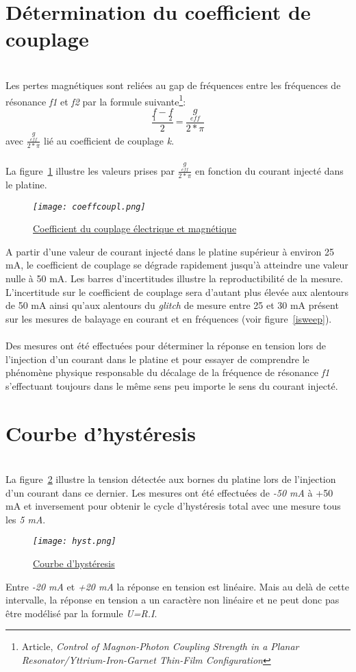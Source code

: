 \documentclass[12pt,fleqn]{book} %
\begin{document}
\section{Détermination du coefficient de couplage}
~\\\noindent Les pertes magnétiques sont reliées au gap de fréquences entre les fréquences de résonance \emph{f1} et \emph{f2} par la formule suivante\footnote{Article, \emph{Control of Magnon-Photon Coupling Strength in a Planar Resonator/Yttrium-Iron-Garnet Thin-Film Configuration}}: 
$$\frac{\underset{1}{f}-\underset{2}{f}}{2}\ \text{=}\ \frac{\underset{eff}{g}}{2*\pi}$$
avec $\frac{\underset{eff}{g}}{2*\pi}$ lié au coefficient de couplage \emph{k}.
~\\\\La figure~\underline{\color{blue}\ref{coeffcoupl}} illustre les valeurs prises par $\frac{\underset{eff}{g}}{2*\pi}$ en fonction du courant injecté dans le platine.
\begin{figure}[H]
	\centering
	\itshape
	\texttt{[image: coeffcoupl.png]}
	\caption{\label{coeffcoupl} \underline{Coefficient du couplage électrique et magnétique}}
\end{figure}
\noindent A partir d'une valeur de courant injecté dans le platine supérieur à environ 25 mA, le coefficient de couplage se dégrade rapidement jusqu'à atteindre une valeur nulle à 50 mA. Les barres d'incertitudes illustre la reproductibilité de la mesure. L'incertitude sur le coefficient de couplage sera d'autant plus élevée aux alentours de 50 mA ainsi qu'aux alentours du \emph{glitch} de mesure entre 25 et 30 mA présent sur les mesures de balayage en courant et en fréquences (voir figure~\underline{\color{blue}\ref{isweep}}).
~\\\\Des mesures ont été effectuées pour déterminer la réponse en tension lors de l'injection d'un courant dans le platine et pour essayer de comprendre le phénomène physique responsable du décalage de la fréquence de résonance \emph{f1} s'effectuant toujours dans le même sens peu importe le sens du courant injecté. 
\section{Courbe d'hystéresis}
~\\\noindent La figure~\underline{\color{blue}\ref{hyst}} illustre la tension détectée aux bornes du platine lors de l'injection d'un courant dans ce dernier. Les mesures ont été effectuées de \emph{-50 mA} à {+50 mA} et inversement pour obtenir le cycle d'hystéresis total avec une mesure tous les \emph{5 mA}.
\begin{figure}[H]
	\centering
	\itshape
	\texttt{[image: hyst.png]}
	\caption{\label{hyst} \underline{Courbe d'hystéresis}}
\end{figure}
\noindent Entre \emph{-20 mA} et \emph{+20 mA} la réponse en tension est linéaire. Mais au delà de cette intervalle, la réponse en tension a un caractère non linéaire et ne peut donc pas être modélisé par la formule \emph{U=R.I}.
\end{document}
